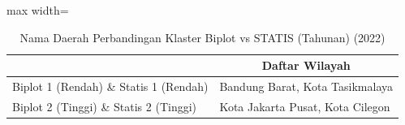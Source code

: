 \begin{table}[H]
\centering
\caption{Nama Daerah Perbandingan Klaster Biplot vs STATIS (Tahunan) (2022)} \label{tab:sample2biplot_statis_comp_name_2022}
\begin{adjustbox}{max width=\textwidth}
\begin{tabular}{|>{\centering\arraybackslash}p{4cm}|p{10cm}|}
\hline
\multicolumn{1}{|c|}{\textbf{Kategori}} & \multicolumn{1}{c|}{\textbf{Daftar Wilayah}} \\
\hline
Biplot 1 (Rendah) \& Statis 1 (Rendah) & Bandung Barat, Kota Tasikmalaya \\
\hline
Biplot 2 (Tinggi) \& Statis 2 (Tinggi) & Kota Jakarta Pusat, Kota Cilegon \\
\hline
\end{tabular}
\end{adjustbox}
\end{table}